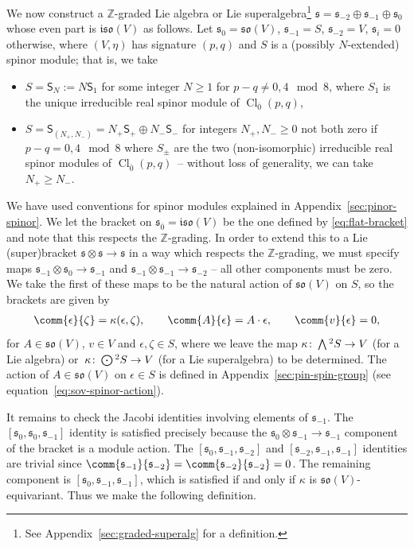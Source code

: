 \documentclass[10pt,a4paper]{amsart}
\numberwithin{equation}{section}
\newcommand{\fs}{\mathfrak{s}}
\newcommand{\fso}{\mathfrak{so}}
\newcommand{\fiso}{\mathfrak{iso}}
\newcommand{\ZZ}{\mathbb{Z}}
\newcommand{\ssS}{\mathsf{S}}
\newcommand{\Wedge}{\mathchoice{{\textstyle\bigwedge}}{\bigwedge}{\bigwedge}{\bigwedge}}	%
\newcommand{\Odot}{\mathchoice{{\textstyle\bigodot}}{\bigodot}{\bigodot}{\bigodot}}
\newcommand{\1}{\mathbbm{1}}
\DeclareMathOperator{\Cl}{Cl}
\begin{document}
We now construct a $\ZZ$-graded Lie algebra or Lie superalgebra\footnote{See Appendix~\ref{sec:graded-superalg} for a definition.} $\fs=\fs_{-2}\oplus\fs_{-1}\oplus\fs_{0}$ whose even part is $\fiso(V)$ as follows. Let
$\fs_0 = \fso(V)$, $
 \fs_{-1} = S$, $
 \fs_{-2} = V$, $
 \fs_i = 0$ otherwise,
where $(V,\eta)$ has signature $(p,q)$ and $S$ is a (possibly $N$-extended) spinor module; that is, we take
\begin{itemize}\itemsep=0pt
	\item $S = \ssS_N := N\ssS_1$ for some integer $N\geq 1$ for $p-q\neq 0,4\mod 8$, where $S_1$ is the unique irreducible real spinor module of $\Cl_{\overline 0}(p,q)$,
	\item $S = \ssS_{(N_+,N_-)} = N_+\ssS_+\oplus N_-\ssS_-$ for integers $N_+, N_-\geq 0$ not both zero if $p-q= 0,4\mod 8$ where $S_\pm$ are the two (non-isomorphic) irreducible real spinor modules of $\Cl_{\overline 0}(p,q)$~-- without loss of generality, we can take $N_+\geq N_-$.
\end{itemize}
We have used conventions for spinor modules explained in Appendix~\ref{sec:pinor-spinor}. We let the bracket on $\fs_{\overline 0}=\fiso(V)$ be the one defined by \eqref{eq:flat-bracket} and note that this respects the $\ZZ$-grading. In order to extend this to a Lie (super)bracket $\fs\otimes\fs\to\fs$ in a way which respects the $\ZZ$-grading, we must specify maps $\fs_{-1}\otimes\fs_0\to\fs_{-1}$ and $\fs_{-1}\otimes\fs_{-1}\to\fs_{-2}$ -- all other components must be zero. We take the first of these maps to be the natural action of $\fso(V)$ on $S$, so the brackets are given by
\begin{align}\label{eq:flat-spinor-bracket}
 \comm{\epsilon}{\zeta} = \kappa(\epsilon,\zeta),\qquad
 \comm{A}{\epsilon} = A\cdot\epsilon,\qquad
 \comm{v}{\epsilon} = 0,
\end{align}
for $A\in\fso(V)$, $v\in V$ and $\epsilon,\zeta\in S$, where we leave the map $\kappa\colon \Wedge^2 S\to V$ (for a Lie algebra) or~${\kappa\colon \Odot^2 S\to V}$ (for a Lie superalgebra) to be determined. The action of $A\in\fso(V)$ on $\epsilon\in S$ is defined in Appendix~\ref{sec:pin-spin-group} (see equation~\eqref{eq:sov-spinor-action}).

It remains to check the Jacobi identities involving elements of $\fs_{-1}$. The $[\fs_0,\fs_0,\fs_{-1}]$ identity is satisfied precisely because the $\fs_0\otimes\fs_{-1}\to\fs_{-1}$ component of the bracket is a module action. The $[\fs_0,\fs_{-1},\fs_{-2}]$ and $[\fs_{-2},\fs_{-1},\fs_{-1}]$ identities are trivial since $\comm{\fs_{-1}}{\fs_{-2}}=\comm{\fs_{-2}}{\fs_{-2}}=0$. The remaining component is $[\fs_0,\fs_{-1},\fs_{-1}]$, which is satisfied if and only if $\kappa$ is $\fso(V)$-equivariant. Thus we make the following definition.
\end{document}
